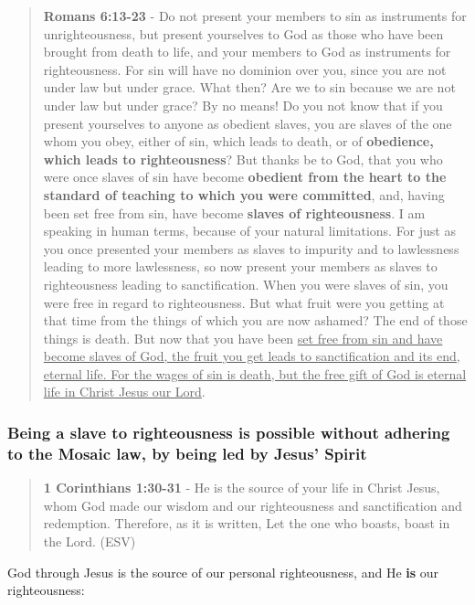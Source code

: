 \documentclass[11pt]{article}
\begin{document}
\begin{quote}
\textbf{Romans 6:13-23} - Do not present your members to sin as instruments for unrighteousness, but present yourselves to God as those who have been brought from death to life, and your members to God as instruments for righteousness.  For sin will have no dominion over you, since you are not under law but under grace.  What then? Are we to sin because we are not under law but under grace? By no means!  Do you not know that if you present yourselves to anyone as obedient slaves, you are slaves of the one whom you obey, either of sin, which leads to death, or of \textbf{obedience, which leads to righteousness}?  But thanks be to God, that you who were once slaves of sin have become \textbf{obedient from the heart to the standard of teaching to which you were committed}, and, having been set free from sin, have become \textbf{slaves of righteousness}.  I am speaking in human terms, because of your natural limitations. For just as you once presented your members as slaves to impurity and to lawlessness leading to more lawlessness, so now present your members as slaves to righteousness leading to sanctification.  When you were slaves of sin, you were free in regard to righteousness.  But what fruit were you getting at that time from the things of which you are now ashamed? The end of those things is death.  But now that you have been \uline{set free from sin and have become slaves of God, the fruit you get leads to sanctification and its end, eternal life.  For the wages of sin is death, but the free gift of God is eternal life in Christ Jesus our Lord}.
\end{quote}

\subsubsection{Being a slave to righteousness is possible without adhering to the Mosaic law, by being led by Jesus' Spirit}
\label{sec:org1155225}

\begin{quote}
\textbf{1 Corinthians 1:30-31} -  He is the source of your life in Christ Jesus, whom God made our wisdom and our righteousness and sanctification and redemption.  Therefore, as it is written, Let the one who boasts, boast in the Lord.  (ESV)
\end{quote}

God through Jesus is the source of our personal righteousness, and He \textbf{is} our righteousness:
\end{document}
